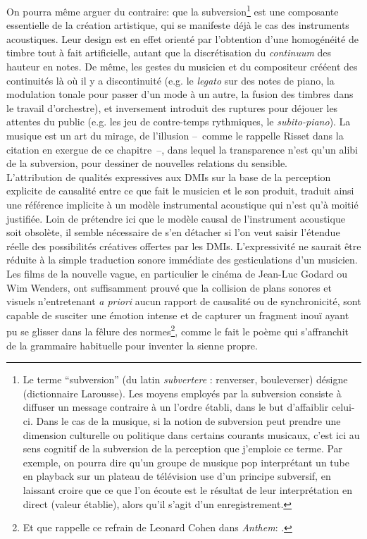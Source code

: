 \indent On pourra même arguer du contraire: que la subversion\footnote{Le terme ``subversion'' (du latin \textit{subvertere} : renverser, bouleverser) désigne  (dictionnaire Larousse). Les moyens employés par la subversion consiste à diffuser un message contraire à un l'ordre établi, dans le but d'affaiblir celui-ci. Dans le cas de la musique, si la notion de subversion peut prendre une dimension culturelle ou politique dans certains courants musicaux, c'est ici au sens cognitif de la subversion de la perception que j'emploie ce terme. Par exemple, on pourra dire qu'un groupe de musique pop interprétant un tube en playback sur un plateau de télévision use d'un principe subversif, en laissant croire que ce que l'on écoute est le résultat de leur interprétation en direct (valeur établie), alors qu'il s'agit d'un enregistrement.} est une composante essentielle de la création artistique, qui se manifeste déjà le cas des instruments acoustiques. Leur design est en effet orienté par l'obtention d'une homogénéité de timbre tout à fait artificielle, autant que la discrétisation du \textit{continuum} des hauteur en notes. De même, les gestes du musicien et du compositeur crééent des continuités là où il y a discontinuité (e.g. le \textit{legato} sur des notes de piano, la modulation tonale pour passer d'un mode à un autre, la fusion des timbres dans le travail d'orchestre),  et inversement introduit des ruptures pour déjouer les attentes du public (e.g. les jeu de contre-temps rythmiques, le \textit{subito-piano}). La musique est un art du mirage, de l'illusion --~comme le rappelle Risset dans la citation en exergue de ce chapitre~--, dans lequel la transparence n'est qu'un alibi de la subversion, pour dessiner de nouvelles relations du sensible.\\
\indent L'attribution de qualités expressives aux \glspl{DMI} sur la base de la perception explicite de causalité entre ce que fait le musicien et le son produit, traduit ainsi une référence implicite à un modèle instrumental acoustique qui n'est qu'à moitié justifiée. Loin de prétendre ici que le modèle causal de l'instrument acoustique soit obsolète, il semble nécessaire de s'en détacher si l'on veut saisir l'étendue réelle des possibilités créatives offertes par les \glspl{DMI}. L'expressivité ne saurait être réduite à la simple traduction sonore immédiate des gesticulations d'un musicien. Les films de la nouvelle vague, en particulier le cinéma de Jean-Luc Godard ou Wim Wenders, ont suffisamment prouvé que la collision de plans sonores et visuels n'entretenant \textit{a priori} aucun rapport de causalité ou de synchronicité, sont capable de susciter une émotion intense et de capturer un fragment inouï ayant pu se glisser dans la fêlure des normes\footnote{Et que rappelle ce refrain de Leonard Cohen dans \textit{Anthem}: .}, comme le fait le poème qui s'affranchit de la grammaire habituelle pour inventer la sienne propre.\\
